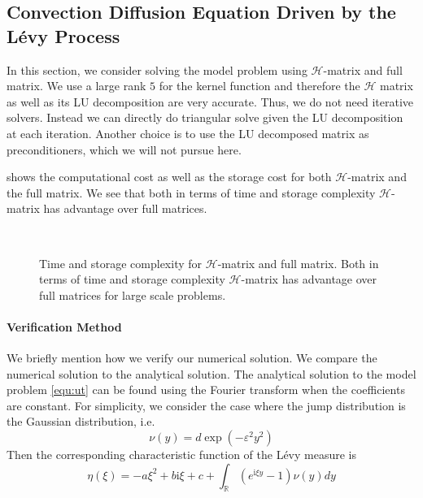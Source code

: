 \documentclass[3p,,preprint,12pt]{elsarticle}
\newcommand{\ii}[0]{\mathrm{i}}
\newcommand{\RR}[0]{\mathbb{R}}
\theoremstyle{definition}
\begin{document}
\subsection{Convection Diffusion Equation Driven by the L\'evy Process}

In this section, we consider solving the model problem using $\mathcal{H}$-matrix and full matrix. We use a large rank $5$ for the kernel function and therefore the $\mathcal{H}$ matrix as well as its LU decomposition are very accurate. Thus, we do not need iterative solvers. Instead we can directly do triangular solve given the LU decomposition at each iteration. Another choice is to use the LU decomposed matrix as preconditioners, which we will not pursue here.  

 shows the computational cost as well as the storage cost for both $\mathcal{H}$-matrix and the full matrix. We see that both in terms of time and storage complexity $\mathcal{H}$-matrix has advantage over full matrices.

\begin{figure}[htpb]
\centering
\scalebox{0.3}{}~
\scalebox{0.3}{}

\caption{Time and storage complexity for $\mathcal{H}$-matrix and full matrix. Both in terms of time and storage complexity $\mathcal{H}$-matrix has advantage over full matrices for large scale problems.}
\label{fig:s}
\end{figure}



\paragraph{Verification Method} We briefly mention how we verify our numerical solution. We compare the numerical solution to the analytical solution. The analytical solution to the model problem \cref{equ:ut} can be found using the Fourier transform when the coefficients are constant. For simplicity, we consider the case where the jump distribution is the Gaussian distribution, i.e. 
\begin{equation}
	\nu(y) = d\exp(-\varepsilon^2 y^2)
\end{equation}
Then the corresponding characteristic function of the L\'evy measure is 
\begin{equation}
	\eta(\xi) = -a\xi^2 + b\ii \xi + c + \int_\RR (e^{\ii \xi y}-1)\nu(y)dy
\end{equation}
\end{document}
